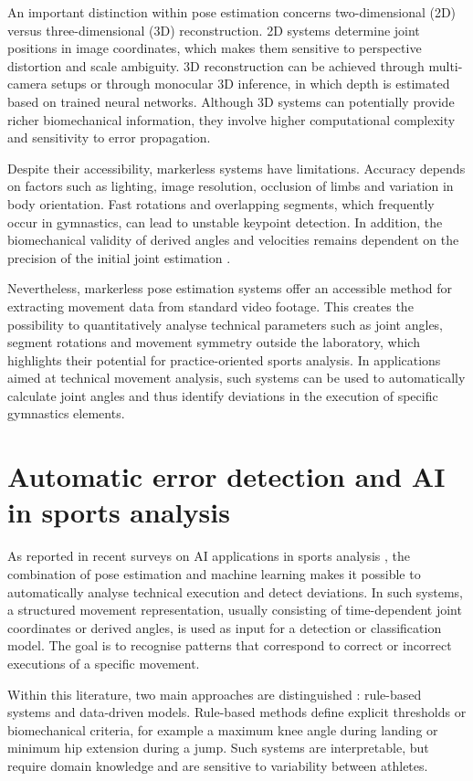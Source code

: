 An important distinction within pose estimation concerns two-dimensional (2D) versus three-dimensional (3D) reconstruction. 2D systems determine joint positions in image coordinates, which makes them sensitive to perspective distortion and scale ambiguity. 3D reconstruction can be achieved through multi-camera setups or through monocular 3D inference, in which depth is estimated based on trained neural networks. Although 3D systems can potentially provide richer biomechanical information, they involve higher computational complexity and sensitivity to error propagation.

Despite their accessibility, markerless systems have limitations. Accuracy depends on factors such as lighting, image resolution, occlusion of limbs and variation in body orientation. Fast rotations and overlapping segments, which frequently occur in gymnastics, can lead to unstable keypoint detection. In addition, the biomechanical validity of derived angles and velocities remains dependent on the precision of the initial joint estimation \autocite{Ota2025Markerless}.

Nevertheless, markerless pose estimation systems offer an accessible method for extracting movement data from standard video footage. This creates the possibility to quantitatively analyse technical parameters such as joint angles, segment rotations and movement symmetry outside the laboratory, which highlights their potential for practice-oriented sports analysis. In applications aimed at technical movement analysis, such systems can be used to automatically calculate joint angles and thus identify deviations in the execution of specific gymnastics elements.

\section{Automatic error detection and AI in sports analysis}
\label{sec:auto-foutdetectie}
As reported in recent surveys on AI applications in sports analysis \autocite{Souaifi2025}, the combination of pose estimation and machine learning makes it possible to automatically analyse technical execution and detect deviations. In such systems, a structured movement representation, usually consisting of time-dependent joint coordinates or derived angles, is used as input for a detection or classification model. The goal is to recognise patterns that correspond to correct or incorrect executions of a specific movement.

Within this literature, two main approaches are distinguished \autocite{Souaifi2025}: rule-based systems and data-driven models. Rule-based methods define explicit thresholds or biomechanical criteria, for example a maximum knee angle during landing or minimum hip extension during a jump. Such systems are interpretable, but require domain knowledge and are sensitive to variability between athletes.

